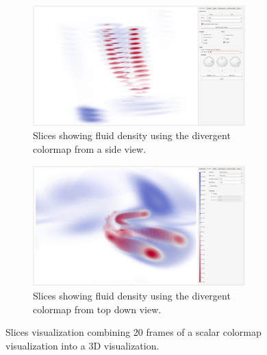 \begin{figure}[tbh]
	\centering
	\begin{subfigure}{0.45\textwidth}
		\centering
		\includegraphics[width=0.9\textwidth, trim={35px 30px 430px 30px}, clip]{img/slices/diverging_sides}
		\caption{Slices showing fluid density using the divergent colormap from a side view.}
		\label{fig:slices:colormap:side}
	\end{subfigure}
	\hspace{30px}
	\begin{subfigure}{0.45\textwidth}	
		\centering
		\includegraphics[width=0.9\textwidth, trim={35px 30px 430px 30px}, clip]{img/slices/divering}
		\caption{Slices showing fluid density using the divergent colormap from top down view.}
		\label{fig:slices:colormap:top}
	\end{subfigure}
	\caption{Slices visualization combining 20 frames of a scalar colormap visualization into a 3D visualization.}
	\label{fig:slices:colormap}
\end{figure}


